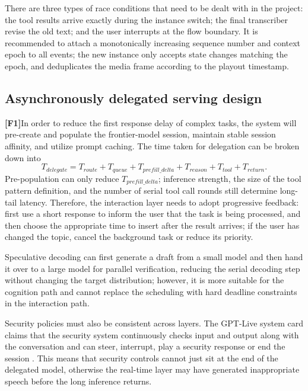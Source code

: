 \documentclass[UTF8,fontset=none,a4paper,10pt]{ctexart}
\newcommand{\FOne}{\textcolor{official}{\textbf{[F1]}}}
\begin{document}
There are three types of race conditions that need to be dealt with in the project: the tool results arrive exactly during the instance switch; the final transcriber revise the old text; and the user interrupts at the flow boundary. It is recommended to attach a monotonically increasing sequence number and context epoch to all events; the new instance only accepts state changes matching the epoch, and deduplicates the media frame according to the playout timestamp.

\subsection{Asynchronously delegated serving design}

\FOne In order to reduce the first response delay of complex tasks, the system will pre-create and populate the frontier-model session, maintain stable session affinity, and utilize prompt caching\cite{openai2026continuous}. The time taken for delegation can be broken down into
\begin{equation}
T_{delegate}=T_{route}+T_{queue}+T_{prefill\_delta}+T_{reason}+T_{tool}+T_{return}.
\end{equation}
Pre-population can only reduce $T_{prefill\_delta}$; inference strength, the size of the tool pattern definition, and the number of serial tool call rounds still determine long-tail latency. Therefore, the interaction layer needs to adopt progressive feedback: first use a short response to inform the user that the task is being processed, and then choose the appropriate time to insert after the result arrives; if the user has changed the topic, cancel the background task or reduce its priority.

Speculative decoding can first generate a draft from a small model and then hand it over to a large model for parallel verification, reducing the serial decoding step\cite{leviathan2023speculative} without changing the target distribution; however, it is more suitable for the cognition path and cannot replace the scheduling with hard deadline constraints in the interaction path.

Security policies must also be consistent across layers. The GPT-Live system card claims that the security system continuously checks input and output along with the conversation and can steer, interrupt, play a security response or end the session \cite{openai2026safety}. This means that security controls cannot just sit at the end of the delegated model, otherwise the real-time layer may have generated inappropriate speech before the long inference returns.
\end{document}
